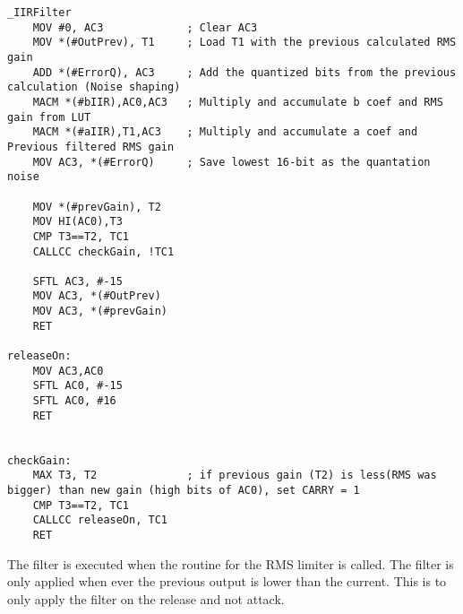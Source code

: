 \begin{lstlisting}[language={[x86masm]Assembler}, caption = {Release time algorithm.},label={listingCompressorMain}]
_IIRFilter
	MOV #0, AC3				; Clear AC3
	MOV *(#OutPrev), T1		; Load T1 with the previous calculated RMS gain
	ADD *(#ErrorQ), AC3		; Add the quantized bits from the previous calculation (Noise shaping)
	MACM *(#bIIR),AC0,AC3	; Multiply and accumulate b coef and RMS gain from LUT
	MACM *(#aIIR),T1,AC3	; Multiply and accumulate a coef and Previous filtered RMS gain
	MOV AC3, *(#ErrorQ)		; Save lowest 16-bit as the quantation noise
	
	MOV *(#prevGain), T2
	MOV HI(AC0),T3
	CMP T3==T2, TC1
	CALLCC checkGain, !TC1
	
	SFTL AC3, #-15
	MOV AC3, *(#OutPrev)
	MOV AC3, *(#prevGain)
	RET

releaseOn:
	MOV AC3,AC0
	SFTL AC0, #-15
	SFTL AC0, #16
	RET
	

checkGain:
	MAX T3, T2				; if previous gain (T2) is less(RMS was bigger) than new gain (high bits of AC0), set CARRY = 1
	CMP T3==T2, TC1
	CALLCC releaseOn, TC1
	RET
\end{lstlisting}

The filter is executed when the routine for the RMS limiter is called. The filter is only applied when ever the previous output is lower than the current. This is to only apply the filter on the release and not attack.





